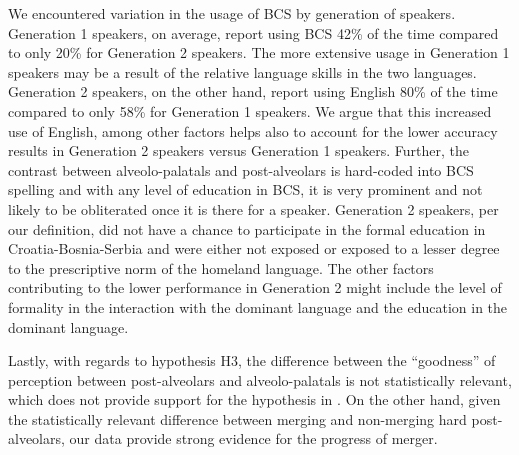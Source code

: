 \documentclass[output=paper,
modfonts,
newtxmath,
hidelinks,
]{langscibook}
\begin{document}
We encountered variation in the usage of BCS by generation of speakers. Generation 1 speakers, on average, report using BCS 42\% of the time compared to only 20\% for Generation 2 speakers. The more extensive usage in Generation 1 speakers may be a result of the relative language skills in the two languages. Generation 2 speakers, on the other hand, report using English 80\% of the time compared to only 58\% for Generation 1 speakers. We argue that this increased use of English, among other factors helps also to account for the lower accuracy results in Generation 2 speakers versus Generation 1 speakers. Further, the contrast between alveolo-palatals and post-alveolars is hard-coded into BCS spelling and with any level of education in BCS, it is very prominent and not likely to be obliterated once it is there for a speaker. Generation 2 speakers, per our definition, did not have a chance to participate in the formal education in Croatia-Bosnia-Serbia and were either not exposed or exposed to a lesser degree to the prescriptive norm of the homeland language. The other factors contributing to the lower performance in Generation 2 might include the level of formality in the interaction with the dominant language and the education in the dominant language.



Lastly, with regards to hypothesis H3, the difference between the “goodness” of perception between post-alveolars and alveolo-palatals is not statistically relevant, which does not provide support for the hypothesis in \citet{Cavar-etal2016}. On the other hand, given the statistically relevant difference between merging and non-merging hard post-alveolars, our data provide strong evidence for the progress of merger.\largerpage[-1]
\end{document}
